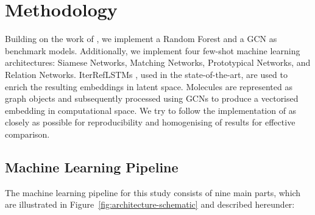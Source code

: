 \section{Methodology}

Building on the work of \citet{altae2017low}, we implement a Random Forest and a GCN as benchmark models. Additionally, we implement four few-shot machine learning architectures: Siamese Networks, Matching Networks, Prototypical Networks, and Relation Networks. IterRefLSTMs \citep{altae2017low}, used in the state-of-the-art, are used to enrich the resulting embeddings in latent space. Molecules are represented as graph objects and subsequently processed using GCNs to produce a vectorised embedding in computational space. We try to follow the implementation of \citet{altae2017low} as closely as possible for reproducibility and homogenising of results for effective comparison.

\subsection{Machine Learning Pipeline}

The machine learning pipeline for this study consists of nine main parts, which are illustrated in Figure~\ref{fig:architecture-schematic} and described hereunder:

